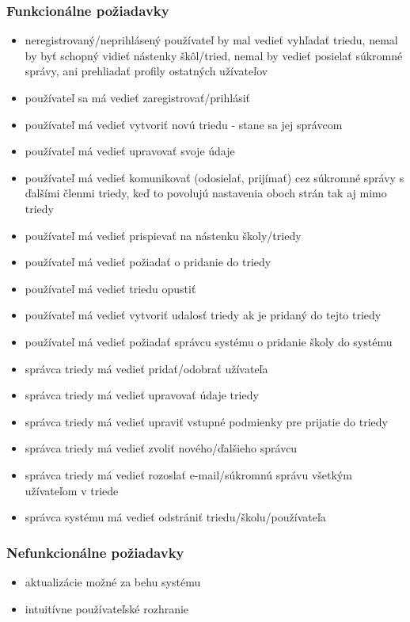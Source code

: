 \documentclass[slovak, 12pt, Times New Roman]{article}
\begin{document}
			\subsubsection{Funkcionálne požiadavky}
				\begin{itemize} \itemsep0pt \parskip0pt 
					\item neregistrovaný/neprihlásený používateľ by mal vedieť vyhľadať triedu, nemal by byť schopný vidieť nástenky škôl/tried, nemal by vedieť posielať súkromné správy, ani prehliadať profily ostatných užívateľov
					\item používateľ sa má vedieť zaregistrovať/prihlásiť
					\item používateľ má vedieť vytvoriť novú triedu - stane sa jej správcom
					\item používateľ má vedieť upravovať svoje údaje
					\item používateľ má vedieť komunikovať (odosielať, prijímať) cez súkromné správy s ďalšími členmi triedy, keď to povolujú 			nastavenia oboch strán tak aj mimo triedy
					\item používateľ má vedieť prispievať na nástenku školy/triedy
					\item používateľ má vedieť požiadať o pridanie do triedy
					\item používateľ má vedieť triedu opustiť
					\item používateľ má vedieť vytvoriť udalosť triedy ak je pridaný do tejto triedy
					\item používateľ má vedieť požiadať správcu systému o pridanie školy do systému
					\item správca triedy má vedieť pridať/odobrať užívateľa
					\item správca triedy má vedieť upravovať údaje triedy
					\item správca triedy má vedieť upraviť vstupné podmienky pre prijatie do triedy
					\item správca triedy má vedieť zvoliť nového/ďalšieho správcu
					\item správca triedy má vedieť rozoslať e-mail/súkromnú správu všetkým užívateľom v triede
					\item správca systému má vedieť odstrániť triedu/školu/používateľa
				\end{itemize}
			\subsubsection{Nefunkcionálne požiadavky}
				\begin{itemize} \itemsep0pt \parskip0pt 
					\item aktualizácie možné za behu systému					
					\item intuitívne používateľské rozhranie
				\end{itemize}
\end{document}
